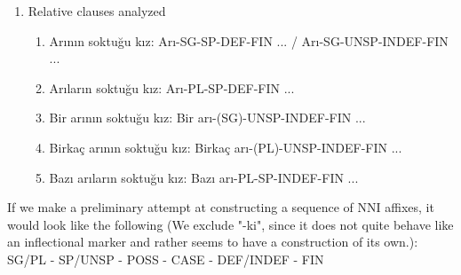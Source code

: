\documentclass[11pt]{article} %
\begin{document}
\begin{enumerate}[resume*] 
	\item Relative clauses analyzed \label{RelClAn3}
	\begin{enumerate}[label=(\alph*), ref=(\alph*)]\itemsep1pt
	\item Arının soktuğu kız: Arı-SG-SP-DEF-FIN ... / Arı-SG-UNSP-INDEF-FIN ... \label{a}
	\item Arıların soktuğu kız: Arı-PL-SP-DEF-FIN ... \label{b}
	\item Bir arının soktuğu kız: Bir arı-(SG)-UNSP-INDEF-FIN ... \label{c}
	\item Birkaç arının soktuğu kız: Birkaç arı-(PL)-UNSP-INDEF-FIN ... \label{d}
	\item Bazı arıların soktuğu kız: Bazı arı-PL-SP-INDEF-FIN ... \label{e}
	\end{enumerate}
\end{enumerate}

If we make a preliminary attempt at constructing a sequence of NNI affixes, it would look like the following (We exclude "-ki", since it does not quite behave like an inflectional marker and rather seems to have a construction of its own.): \\

SG/PL - SP/UNSP - POSS - CASE - DEF/INDEF - FIN

\newpage



\newpage
\end{document}
